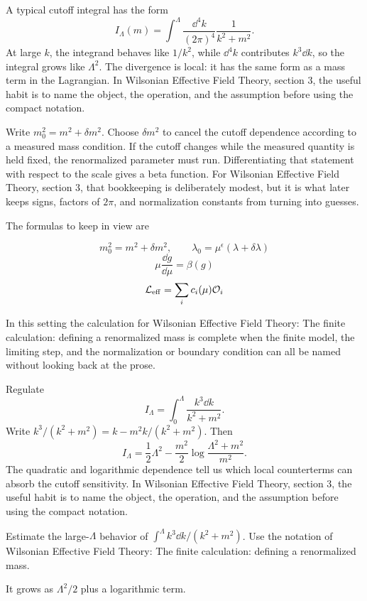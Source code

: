 A typical cutoff integral has the form
\[
  I_\Lambda(m)=\int^{\Lambda}\frac{\dd^4k}{(2\pi)^4}\frac{1}{k^2+m^2}.
\]
At large \(k\), the integrand behaves like \(1/k^2\), while \(\dd^4k\) contributes \(k^3\dd k\), so the integral grows like \(\Lambda^2\).  The divergence is local: it has the same form as a mass term in the Lagrangian.  In Wilsonian Effective Field Theory, section 3, the useful habit is to name the object, the operation, and the assumption before using the compact notation.

Write \(m_0^2=m^2+\delta m^2\).  Choose \(\delta m^2\) to cancel the cutoff dependence according to a measured mass condition.  If the cutoff changes while the measured quantity is held fixed, the renormalized parameter must run.  Differentiating that statement with respect to the scale gives a beta function.  For Wilsonian Effective Field Theory, section 3, that bookkeeping is deliberately modest, but it is what later keeps signs, factors of \(2\pi\), and normalization constants from turning into guesses.

The formulas to keep in view are

\[
  m_0^2=m^2+\delta m^2,\qquad \lambda_0=\mu^\epsilon(\lambda+\delta\lambda)
\]
\[
  \mu\frac{\dd g}{\dd\mu}=\beta(g)
\]
\[
  \mathcal L_{\mathrm{eff}}=\sum_i c_i(\mu)\mathcal O_i
\]

In this setting the calculation for Wilsonian Effective Field Theory: The finite calculation: defining a renormalized mass is complete when the finite model, the limiting step, and the normalization or boundary condition can all be named without looking back at the prose.




\begin{example}
Regulate
\[
  I_\Lambda=\int_0^\Lambda\frac{k^3\dd k}{k^2+m^2}.
\]
Write \(k^3/(k^2+m^2)=k-m^2k/(k^2+m^2)\).  Then
\[
  I_\Lambda=\frac12\Lambda^2-\frac{m^2}{2}\log\frac{\Lambda^2+m^2}{m^2}.
\]
The quadratic and logarithmic dependence tell us which local counterterms can absorb the cutoff sensitivity.  In Wilsonian Effective Field Theory, section 3, the useful habit is to name the object, the operation, and the assumption before using the compact notation.
\end{example}



\begin{exercise}
Estimate the large-\(\Lambda\) behavior of \(\int^\Lambda k^3\dd k/(k^2+m^2)\).  Use the notation of Wilsonian Effective Field Theory: The finite calculation: defining a renormalized mass.
\begin{answer}
It grows as \(\Lambda^2/2\) plus a logarithmic term.
\end{answer}
\end{exercise}

